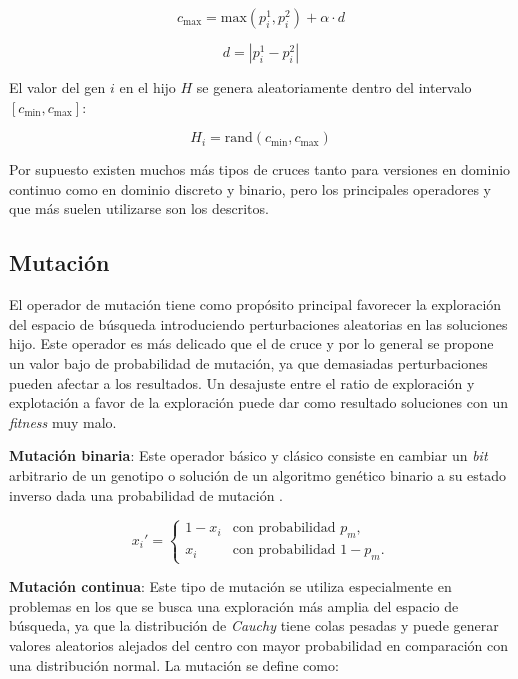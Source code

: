 \documentclass[12pt,letterpaper]{article}
\begin{document}
\begin{equation}
    c_{\text{max}} = \text{max}(p_i^1, p_i^2) + \alpha \cdot d
    \label{eq:blx_cmax}
\end{equation}

\begin{equation}
    d = |p_i^1 - p_i^2|
    \label{eq:blx_d}
\end{equation}

El valor del gen \( i \) en el hijo \( H \) se genera aleatoriamente dentro del intervalo \( [c_{\text{min}}, c_{\text{max}}] \):

\begin{equation}
    H_i = \text{rand}(c_{\text{min}}, c_{\text{max}})
    \label{eq:blx_hi}
\end{equation}

Por supuesto existen muchos más tipos de cruces tanto para versiones en dominio continuo como en dominio discreto y binario, pero los principales operadores y que más suelen utilizarse son los descritos.

\subsection{Mutación}
El operador de mutación tiene como propósito principal favorecer la exploración del espacio de búsqueda introduciendo perturbaciones aleatorias en las soluciones hijo. Este operador es más delicado que el de cruce y por lo general se propone un valor bajo de probabilidad de mutación, ya que demasiadas perturbaciones pueden afectar a los resultados. Un desajuste entre el ratio de exploración y explotación a favor de la exploración puede dar como resultado soluciones con un \textit{fitness} muy malo.

\textbf{Mutación binaria}: Este operador básico y clásico consiste en cambiar un \textit{bit} arbitrario de un genotipo o solución de un algoritmo genético binario a su estado inverso dada una probabilidad de mutación \cite{mirjalili2019genetic}.

\begin{equation}
    x_i' =
    \begin{cases}
        1 - x_i & \text{con probabilidad } p_m,     \\
        x_i     & \text{con probabilidad } 1 - p_m.
    \end{cases}
    \label{eq:binary_mutation}
\end{equation}

\textbf{Mutación continua}: Este tipo de mutación se utiliza especialmente en problemas en los que se busca una exploración más amplia del espacio de búsqueda, ya que la distribución de \textit{Cauchy} tiene colas pesadas y puede generar valores aleatorios alejados del centro con mayor probabilidad en comparación con una distribución normal. La mutación se define como:
\end{document}
